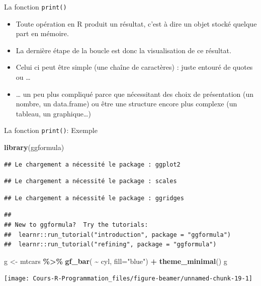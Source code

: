 \documentclass[
  ignorenonframetext,
]{beamer}
\newenvironment{Shaded}{\begin{snugshade}}{\end{snugshade}}
\newcommand{\AttributeTok}[1]{\textcolor[rgb]{0.13,0.29,0.53}{#1}}
\newcommand{\FunctionTok}[1]{\textcolor[rgb]{0.13,0.29,0.53}{\textbf{#1}}}
\newcommand{\NormalTok}[1]{#1}
\newcommand{\OtherTok}[1]{\textcolor[rgb]{0.56,0.35,0.01}{#1}}
\newcommand{\SpecialCharTok}[1]{\textcolor[rgb]{0.81,0.36,0.00}{\textbf{#1}}}
\newcommand{\StringTok}[1]{\textcolor[rgb]{0.31,0.60,0.02}{#1}}
\providecommand{\tightlist}{%
  \setlength{\itemsep}{0pt}\setlength{\parskip}{0pt}}
\begin{document}
\begin{frame}{La fonction \texttt{print()}}
\protect\hypertarget{la-fonction-print}{}
\begin{itemize}
\tightlist
\item
  Toute opération en R produit un résultat, c'est à dire un objet stocké
  quelque part en mémoire.
\item
  La dernière étape de la boucle est donc la visualisation de ce
  résultat.
\item
  Celui ci peut être simple (une chaîne de caractères) : juste entouré
  de quotes ou \ldots{}
\item
  \ldots{} un peu plus compliqué parce que nécessitant des choix de
  présentation (un nombre, un data.frame) ou être une structure encore
  plus complexe (un tableau, un graphique\ldots)
\end{itemize}
\end{frame}

\begin{frame}[fragile]{La fonction \texttt{print()}: Exemple}
\protect\hypertarget{la-fonction-print-exemple}{}
\tiny

\begin{Shaded}
\begin{Highlighting}[]
\FunctionTok{library}\NormalTok{(ggformula)}
\end{Highlighting}
\end{Shaded}

\begin{verbatim}
## Le chargement a nécessité le package : ggplot2
\end{verbatim}

\begin{verbatim}
## Le chargement a nécessité le package : scales
\end{verbatim}

\begin{verbatim}
## Le chargement a nécessité le package : ggridges
\end{verbatim}

\begin{verbatim}
## 
## New to ggformula?  Try the tutorials: 
##  learnr::run_tutorial("introduction", package = "ggformula")
##  learnr::run_tutorial("refining", package = "ggformula")
\end{verbatim}

\begin{Shaded}
\begin{Highlighting}[]
\NormalTok{g }\OtherTok{\textless{}{-}}\NormalTok{ mtcars }\SpecialCharTok{\%\textgreater{}\%} \FunctionTok{gf\_bar}\NormalTok{( }\SpecialCharTok{\textasciitilde{}}\NormalTok{ cyl, }\AttributeTok{fill=}\StringTok{"blue"}\NormalTok{) }\SpecialCharTok{+} \FunctionTok{theme\_minimal}\NormalTok{()}
\NormalTok{g}
\end{Highlighting}
\end{Shaded}

\begin{center}\texttt{[image: Cours-R-Programmation\_files/figure-beamer/unnamed-chunk-19-1]} \end{center}

\normalsize
\end{frame}
\end{document}
